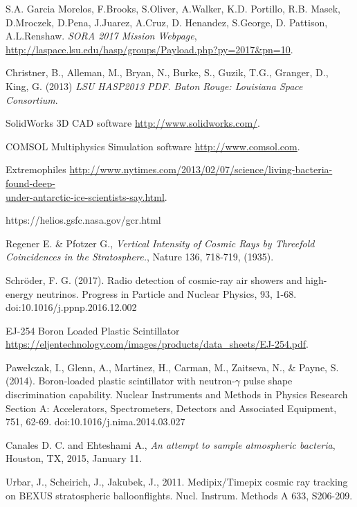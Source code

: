 \newpage

\begin{thebibliography}{9}
S.A. Garcia Morelos, F.Brooks, S.Oliver, A.Walker, K.D. Portillo, R.B. Masek, D.Mroczek, D.Pena, J.Juarez, A.Cruz, D. Henandez, S.George, D. Pattison, A.L.Renshaw. \textit{SORA 2017 Mission Webpage}, \url{http://laspace.lsu.edu/hasp/groups/Payload.php?py=2017&pn=10}.

  Christner, B., Alleman, M., Bryan, N., Burke, S., Guzik, T.G., Granger, D., King, G. (2013) \textit{LSU HASP2013 PDF. Baton Rouge: Louisiana Space Consortium}.

   SolidWorks 3D CAD software \url{http://www.solidworks.com/}.
  
   COMSOL Multiphysics Simulation software \url{http://www.comsol.com}.

  Extremophiles \href{http://www.nytimes.com/2013/02/07/science/living-bacteria-found-deep-under-antarctic-ice-scientists-say.html}{http://www.nytimes.com/2013/02/07/science/living-bacteria-found-deep-\\under-antarctic-ice-scientists-say.html}.

  https://helios.gsfc.nasa.gov/gcr.html

  Regener E. \& Pfotzer G., \textit{Vertical Intensity of Cosmic Rays by Threefold Coincidences in the Stratosphere.}, Nature 136, 718-719, (1935). 

  Schröder, F. G. (2017). Radio detection of cosmic-ray air showers and high-energy neutrinos. Progress in Particle and Nuclear Physics, 93, 1-68. doi:10.1016/j.ppnp.2016.12.002
    
  EJ-254 Boron Loaded Plastic Scintillator \url{https://eljentechnology.com/images/products/data_sheets/EJ-254.pdf}.

  Pawełczak, I., Glenn, A., Martinez, H., Carman, M., Zaitseva, N., \& Payne, S. (2014). Boron-loaded plastic scintillator with neutron-$\gamma$ pulse shape discrimination capability. Nuclear Instruments and Methods in Physics Research Section A: Accelerators, Spectrometers, Detectors and Associated Equipment, 751, 62-69. doi:10.1016/j.nima.2014.03.027

 Canales D. C. and Ehteshami A., \textit{An attempt to sample atmospheric bacteria}, Houston, TX, 2015, January 11.

Urbar, J., Scheirich, J., Jakubek, J., 2011. Medipix/Timepix cosmic ray tracking on BEXUS stratospheric balloonflights. Nucl. Instrum. Methods A 633, S206-209.
	

\end{thebibliography}

